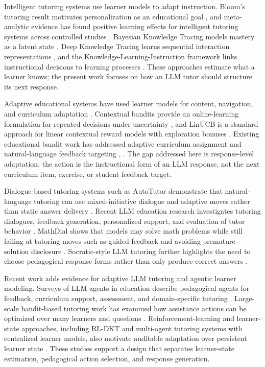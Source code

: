 \documentclass[conference]{IEEEtran}
\begin{document}
Intelligent tutoring systems use learner models to adapt instruction. Bloom's tutoring result motivates personalization as an educational goal \cite{bloom1984}, and meta-analytic evidence has found positive learning effects for intelligent tutoring systems across controlled studies \cite{ma2014}. Bayesian Knowledge Tracing models mastery as a latent state \cite{corbett1994}, Deep Knowledge Tracing learns sequential interaction representations \cite{piech2015}, and the Knowledge-Learning-Instruction framework links instructional decisions to learning processes \cite{koedinger2012}. These approaches estimate what a learner knows; the present work focuses on how an LLM tutor should structure its next response.

Adaptive educational systems have used learner models for content, navigation, and curriculum adaptation \cite{brusilovsky2007}. Contextual bandits provide an online-learning formulation for repeated decisions under uncertainty \cite{auer2002}, and LinUCB is a standard approach for linear contextual reward models with exploration bonuses \cite{li2010}. Existing educational bandit work has addressed adaptive curriculum assignment and natural-language feedback targeting \cite{belfer2022}, \cite{kolchinski2018}. The gap addressed here is response-level adaptation: the action is the instructional form of an LLM response, not the next curriculum item, exercise, or student feedback target.

Dialogue-based tutoring systems such as AutoTutor demonstrate that natural-language tutoring can use mixed-initiative dialogue and adaptive moves rather than static answer delivery \cite{graesser2005}. Recent LLM education research investigates tutoring dialogues, feedback generation, personalized support, and evaluation of tutor behavior \cite{wang2024survey,nam2025,wang2024copilot,stamper2024}. MathDial shows that models may solve math problems while still failing at tutoring moves such as guided feedback and avoiding premature solution disclosure \cite{macina2023}. Socratic-style LLM tutoring further highlights the need to choose pedagogical response forms rather than only produce correct answers \cite{ding2024}.

Recent work adds evidence for adaptive LLM tutoring and agentic learner modeling. Surveys of LLM agents in education describe pedagogical agents for feedback, curriculum support, assessment, and domain-specific tutoring \cite{chu2025agents}. Large-scale bandit-based tutoring work has examined how assistance actions can be optimized over many learners and questions \cite{schmucker2025feedback}. Reinforcement-learning and learner-state approaches, including RL-DKT and multi-agent tutoring systems with centralized learner models, also motivate auditable adaptation over persistent learner state \cite{fu2025rldkt,david2026intellicode}. These studies support a design that separates learner-state estimation, pedagogical action selection, and response generation.
\end{document}
